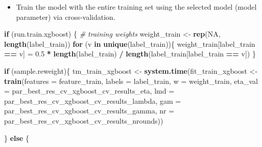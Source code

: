 \documentclass[
]{article}
\newenvironment{Shaded}{\begin{snugshade}}{\end{snugshade}}
\newcommand{\CommentTok}[1]{\textcolor[rgb]{0.56,0.35,0.01}{\textit{#1}}}
\newcommand{\ControlFlowTok}[1]{\textcolor[rgb]{0.13,0.29,0.53}{\textbf{#1}}}
\newcommand{\DataTypeTok}[1]{\textcolor[rgb]{0.13,0.29,0.53}{#1}}
\newcommand{\FloatTok}[1]{\textcolor[rgb]{0.00,0.00,0.81}{#1}}
\newcommand{\KeywordTok}[1]{\textcolor[rgb]{0.13,0.29,0.53}{\textbf{#1}}}
\newcommand{\NormalTok}[1]{#1}
\newcommand{\OperatorTok}[1]{\textcolor[rgb]{0.81,0.36,0.00}{\textbf{#1}}}
\newcommand{\OtherTok}[1]{\textcolor[rgb]{0.56,0.35,0.01}{#1}}
\newcommand{\StringTok}[1]{\textcolor[rgb]{0.31,0.60,0.02}{#1}}
\providecommand{\tightlist}{%
  \setlength{\itemsep}{0pt}\setlength{\parskip}{0pt}}
\begin{document}
\begin{itemize}
\tightlist
\item
  Train the model with the entire training set using the selected model
  (model parameter) via cross-validation.
\end{itemize}

\begin{Shaded}
\begin{Highlighting}[]
\ControlFlowTok{if}\NormalTok{ (run.train.xgboost) \{}
  \CommentTok{# training weights}
\NormalTok{  weight_train <-}\StringTok{ }\KeywordTok{rep}\NormalTok{(}\OtherTok{NA}\NormalTok{, }\KeywordTok{length}\NormalTok{(label_train))}
  \ControlFlowTok{for}\NormalTok{ (v }\ControlFlowTok{in} \KeywordTok{unique}\NormalTok{(label_train))\{}
\NormalTok{    weight_train[label_train }\OperatorTok{==}\StringTok{ }\NormalTok{v] =}\StringTok{ }\FloatTok{0.5} \OperatorTok{*}\StringTok{ }\KeywordTok{length}\NormalTok{(label_train) }\OperatorTok{/}\StringTok{ }\KeywordTok{length}\NormalTok{(label_train[label_train }\OperatorTok{==}\StringTok{ }\NormalTok{v])}
\NormalTok{  \}}

  \ControlFlowTok{if}\NormalTok{ (sample.reweight)\{}
\NormalTok{    tm_train_xgboost <-}\StringTok{ }\KeywordTok{system.time}\NormalTok{(fit_train_xgboost <-}\StringTok{ }\KeywordTok{train}\NormalTok{(}\DataTypeTok{features =}\NormalTok{ feature_train, }\DataTypeTok{labels =}\NormalTok{ label_train,}
                                                                 \DataTypeTok{w =}\NormalTok{  weight_train,}
                                                                 \DataTypeTok{eta_val =}\NormalTok{ par_best_res_cv_xgboost_cv_results_eta,}
                                                                 \DataTypeTok{lmd =}\NormalTok{ par_best_res_cv_xgboost_cv_results_lambda,}
                                                                 \DataTypeTok{gam =}\NormalTok{ par_best_res_cv_xgboost_cv_results_gamma,}
                                                                 \DataTypeTok{nr =}\NormalTok{ par_best_res_cv_xgboost_cv_results_nrounds))}

\NormalTok{  \} }\ControlFlowTok{else}\NormalTok{ \{}


\end{Highlighting}
\end{Shaded}
\end{document}
